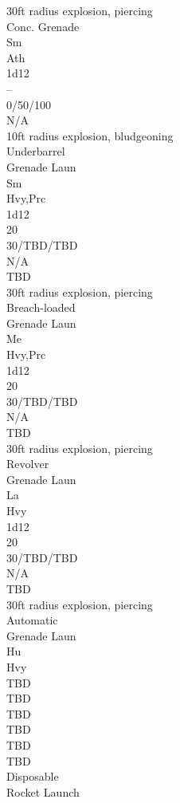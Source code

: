 \documentclass[letterpaper,titlepage,openany,twocolumn]{book}
\begin{document}
30ft radius explosion, piercing\\
Conc. Grenade\\
Sm\\
Ath\\
1d12\\
--\\
0/50/100\\
N/A\\

10ft radius explosion, bludgeoning\\
Underbarrel\\
Grenade Laun\\
Sm\\
Hvy,Prc\\
1d12\\
20\\
30/TBD/TBD\\
N/A\\
TBD\\
30ft radius explosion, piercing\\
Breach-loaded\\
Grenade Laun\\
Me\\
Hvy,Prc\\
1d12\\
20\\
30/TBD/TBD\\
N/A\\
TBD\\
30ft radius explosion, piercing\\
Revolver\\
Grenade Laun\\
La\\
Hvy\\
1d12\\
20\\
30/TBD/TBD\\
N/A\\
TBD\\
30ft radius explosion, piercing\\
Automatic\\
Grenade Laun\\
Hu\\
Hvy\\
TBD\\
TBD\\
TBD\\
TBD\\
TBD\\
TBD\\
Disposable\\
Rocket Launch\\
\end{document}
